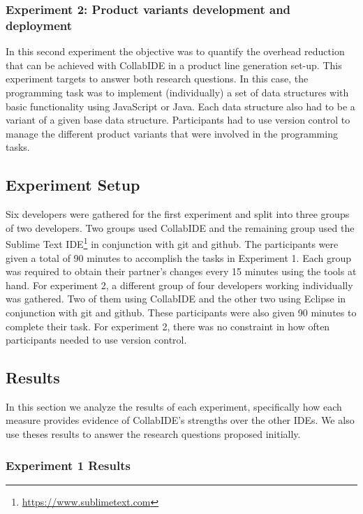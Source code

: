 \subsubsection{Experiment 2: Product variants development and deployment}
In this second experiment the objective was to quantify the overhead reduction that can be achieved 
with CollabIDE in a product line generation set-up. This experiment targets to answer both research 
questions. In this case, the programming task was to implement (individually) a set of 
data structures with basic functionality using JavaScript or Java. Each data structure also had to be a 
variant of a given base data structure. Participants had to use version control to manage the different 
product variants that were involved in the programming tasks.

\subsection{Experiment Setup}

Six developers were gathered for the first experiment and split into three groups of two developers. 
Two groups used CollabIDE and the remaining group used the Sublime Text 
IDE\footnote{\url{https://www.sublimetext.com}} in conjunction with git and github. The participants 
were given a total of 90 minutes to accomplish the tasks in Experiment 1. Each group was required to 
obtain their partner’s changes every 15 minutes using the tools at hand. For experiment 2, a different 
group of four developers working individually was gathered. Two of them using CollabIDE and the 
other two using Eclipse in conjunction with git and github. These participants were also given 90 
minutes to complete their task. For experiment 2, there was no constraint in how often participants 
needed to use version control.
	
\subsection{Results}

In this section we analyze the results of each experiment, specifically how each measure provides 
evidence of CollabIDE's strengths over the other IDEs. We also use theses results to answer the 
research questions proposed initially.

\subsubsection{Experiment 1 Results}

